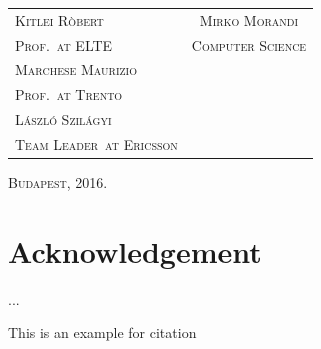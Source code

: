 \documentclass[a4paper,11pt]{report} %
\theoremstyle{change}
\theoremstyle{theoremstyle}
\def\myauthor{Mirko Morandi} %
\def\myacdsup{Kitlei Ròbert} %
\def\myacdsuptit{Prof.}%
\def\myacdsupen{Marchese Maurizio} %
\def\myacdsupentit{Prof.}%
\def\myentryuni{Trento}%
\def\myindsup{László Szilágyi}%
\def\myindsuptit{Team Leader}%
\def\myindcom{Ericsson}%
\def\currentyear{2016.}%
\begin{document}
\begin{titlepage}
\begin{tabular}{p{9cm}c}
{\fontsize{14}{10} \scshape \myacdsup} & {\fontsize{14}{10} \scshape \myauthor}\\

{\fontsize{12}{20} \scshape  \myacdsuptit \ at ELTE}\quad & {\fontsize{12}{20} \scshape Computer Science}\\

{\fontsize{14}{20} \scshape \myacdsupen}&\\

{\fontsize{12}{20} \scshape \myacdsupentit \ at \myentryuni}&\\

{\fontsize{14}{20} \scshape \myindsup}&\\

{\fontsize{12}{20} \scshape \myindsuptit \ at \myindcom}&\\
\end{tabular}

\vspace{3cm}
\begin{center}
{\large \scshape Budapest, \currentyear \\}
\end{center}
\end{titlepage}





\chapter*{Acknowledgement}
...

\tableofcontents













This is an example for citation \cite{abramowitz+stegun}



\end{document}
